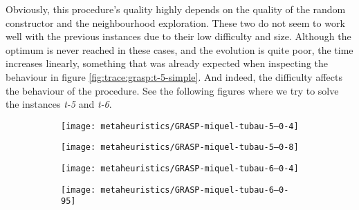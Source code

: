 \hfill

Obviously, this procedure's quality highly depends on the quality of the random constructor
and the neighbourhood exploration. These two do not seem to work well with the previous
instances due to their low difficulty and size. Although the optimum is never reached in these
cases, and the evolution is quite poor, the time increases linearly, something that was already
expected when inspecting the behaviour in figure \ref{fig:trace:grasp:t-5-simple}. And indeed,
the difficulty affects the behaviour of the procedure. See the following figures where we try
to solve the instances \textit{t-5} and \textit{t-6}.

\begin{figure}[H]
    \centering
    \begin{subfigure}{0.45\textwidth}
        \centering
        \texttt{[image: metaheuristics/GRASP-miquel-tubau-5--0-4]}
        \label{fig:trace:grasp:t-5:0.4}
    \end{subfigure}
    \begin{subfigure}{0.45\textwidth}
        \centering
        \texttt{[image: metaheuristics/GRASP-miquel-tubau-5--0-8]}
        \label{fig:trace:grasp:t-5:0.8}
    \end{subfigure}
    \begin{subfigure}{0.45\textwidth}
        \centering
        \texttt{[image: metaheuristics/GRASP-miquel-tubau-6--0-4]}
        \label{fig:trace:grasp:t-6:0.4}
    \end{subfigure}
    \begin{subfigure}{0.45\textwidth}
        \centering
        \texttt{[image: metaheuristics/GRASP-miquel-tubau-6--0-95]}
        \label{fig:trace:grasp:t-6:0.95}
    \end{subfigure}
    \label{fig:trace:grasp:ts}
\end{figure}

